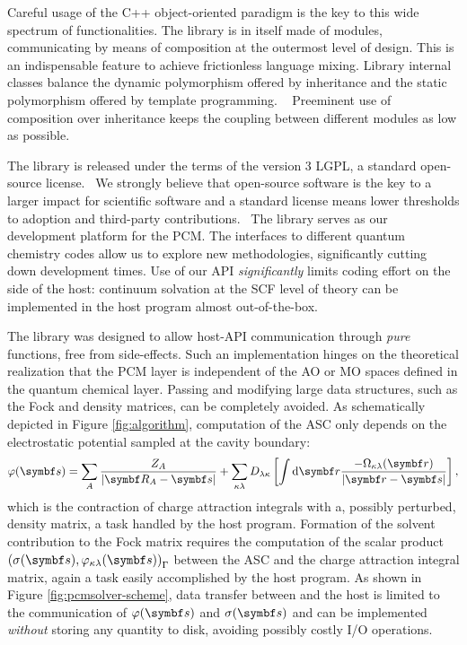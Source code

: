 Careful usage of the C++ object-oriented paradigm is the key to this
wide spectrum of functionalities. The library is in itself made of
modules, communicating by means of composition at the outermost
level of design.
This is an indispensable feature to achieve frictionless language
mixing.
Library internal classes balance the dynamic polymorphism offered by
inheritance and the static polymorphism offered by template programming.
~\autocite{Alexandrescu2001-bp, Sutter2004-nt, Langr2012-js}
Preeminent use of composition over inheritance keeps the coupling
between different modules as low as possible.~\autocite{Gamma1995-fd}

The library is released under the terms of the
version 3 \gls{LGPL}, a standard open-source license.~\autocite{LGPLv3}
We strongly believe that open-source software is the key to a larger
impact for scientific software and a standard license means lower
thresholds to adoption and third-party contributions.~\autocite{LGPLv3}
The library serves as our development platform for the \acrshort{PCM}.
The interfaces to different quantum chemistry codes allow us to explore
new methodologies, significantly cutting down development times.
Use of our \acrshort{API} \emph{significantly} limits coding effort on the
side of the host: continuum solvation at the \acrshort{SCF} level of theory
can be implemented in the host program almost out-of-the-box.

The library was designed to allow host-\acrshort{API} communication through
\emph{pure} functions, \ie{} free from side-effects.
Such an implementation hinges on the theoretical realization that the
\acrshort{PCM} layer is independent of the \acrshort{AO} or \acrshort{MO} spaces
defined in the quantum chemical layer.
Passing and modifying large data structures, such as the Fock and
density matrices, can be completely avoided.
As schematically depicted in Figure \ref{fig:algorithm},
computation of the \acrshort{ASC} only depends on
the electrostatic potential sampled at the cavity boundary:
\begin{equation}
 \esp(\vect{s}) =
 \sum_A \frac{Z_A}{|\vect{R}_A-\vect{s}|} +  \sum_{\kappa\lambda} D_{\lambda\kappa}
 \left[\int\diff\vect{r}\frac{-\Omega_{\kappa\lambda}(\vect{r})}{|\vect{r}-\vect{s}|}\right],
\end{equation}
which is the contraction of charge attraction integrals with a, possibly
perturbed, density matrix, a task handled by the host program.
Formation of the solvent contribution to the Fock matrix requires the
computation of the scalar product
$\scalprod{\sigma(\vect{s})}{\esp_{\kappa\lambda}(\vect{s})}$
between the \acrshort{ASC} and the charge attraction integral matrix, again
a task easily accomplished by the host program.
As shown in Figure \ref{fig:pcmsolver-scheme}, data transfer between
\pcmsolver and the host is limited to the communication of
$\esp(\vect{s})$ and $\sigma(\vect{s})$ and can be implemented
\emph{without} storing any quantity to disk, avoiding possibly costly
I/O operations.

